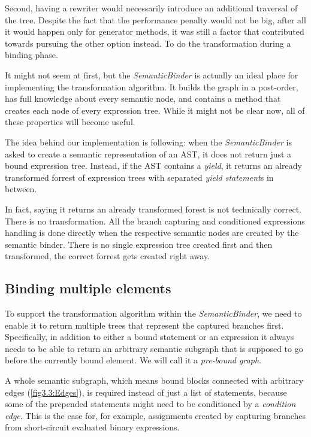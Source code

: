 Second, having a rewriter would necessarily introduce an additional traversal of the tree. Despite the fact that the performance penalty would not be big, after all it would happen only for generator methods, it was still a factor that contributed towards pursuing the other option instead. To do the transformation during a binding phase. 

It might not seem at first, but the \emph{SemanticBinder} is actually an ideal place for implementing the transformation algorithm. It builds the graph in a post-order, has full knowledge about every semantic node, and contains a method that creates each node of every expression tree. While it might not be clear now, all of these properties will become useful.

The idea behind our implementation is following: when the \emph{SemanticBinder} is asked to create a semantic representation of an AST, it does not return just a bound expression tree. Instead, if the AST contains a \emph{yield}, it returns an already transformed forrest of expression trees with separated \emph{yield statement}s in between. 

In fact, saying it returns an already transformed forest is not technically correct. There is no transformation. All the branch capturing and conditioned expressions handling is done directly when the respective semantic nodes are created by the semantic binder. There is no single expression tree created first and then transformed, the correct forrest gets created right away.

\subsection{Binding multiple elements}\label{BindMultiple}

To support the transformation algorithm within the \emph{SemanticBinder}, we need to enable it to return multiple trees that represent the captured branches first. Specifically, in addition to either a bound statement or an expression it always needs to be able to return an arbitrary semantic subgraph that is supposed to go before the currently bound element. We will call it a \emph{pre-bound graph}.

A whole semantic subgraph, which means bound blocks connected with arbitrary edges (\autoref{fig3.3:Edges}), is required instead of just a list of statements, because some of the prepended statements might need to be conditioned by a \emph{condition edge}. This is the case for, for example, assignments created by capturing branches from short-circuit evaluated binary expressions. 

